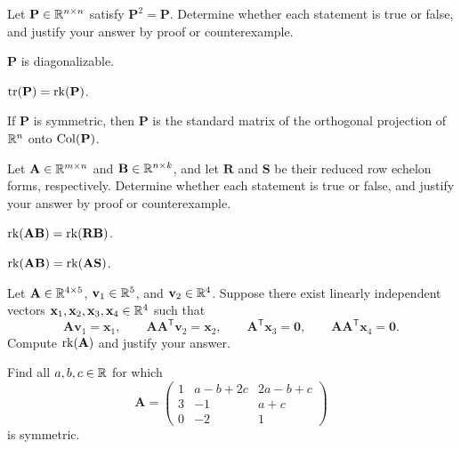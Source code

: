 \begin{problem}
Let $\mathbf P\in\mathbb{R}^{n\times n}$ satisfy $\mathbf P^2=\mathbf P$. Determine whether each statement is true or false, and justify your answer by proof or counterexample.
\begin{problemsubparts}
\item $\mathbf P$ is diagonalizable.
\item $\operatorname{tr}(\mathbf P)=\operatorname{rk}(\mathbf P)$.
\item If $\mathbf P$ is symmetric, then $\mathbf P$ is the standard matrix of the orthogonal projection of $\mathbb{R}^n$ onto $\operatorname{Col}(\mathbf P)$.
\end{problemsubparts}
\end{problem}

\begin{problem}
Let $\mathbf A\in\mathbb{R}^{m\times n}$ and $\mathbf B\in\mathbb{R}^{n\times k}$, and let $\mathbf R$ and $\mathbf S$ be their reduced row echelon forms, respectively. Determine whether each statement is true or false, and justify your answer by proof or counterexample.
\begin{problemsubparts}
\item $\operatorname{rk}(\mathbf A\mathbf B)=\operatorname{rk}(\mathbf R\mathbf B)$.
\item $\operatorname{rk}(\mathbf A\mathbf B)=\operatorname{rk}(\mathbf A\mathbf S)$.
\end{problemsubparts}
\end{problem}

\begin{problem}
Let $\mathbf A\in\mathbb{R}^{4\times5}$, $\mathbf v_1\in\mathbb{R}^5$, and $\mathbf v_2\in\mathbb{R}^4$. Suppose there exist linearly independent vectors $\mathbf x_1,\mathbf x_2,\mathbf x_3,\mathbf x_4\in\mathbb{R}^4$ such that
\[
\mathbf A\mathbf v_1=\mathbf x_1,
\qquad
\mathbf A\mathbf A^{\mathsf T}\mathbf v_2=\mathbf x_2,
\qquad
\mathbf A^{\mathsf T}\mathbf x_3=\mathbf 0,
\qquad
\mathbf A\mathbf A^{\mathsf T}\mathbf x_4=\mathbf 0.
\]
Compute $\operatorname{rk}(\mathbf A)$ and justify your answer.
\end{problem}

\begin{problem}
Find all $a,b,c\in\mathbb{R}$ for which
\[
\mathbf A=
\begin{pmatrix}
1&a-b+2c&2a-b+c\\
3&-1&a+c\\
0&-2&1
\end{pmatrix}
\]
is symmetric.
\end{problem}

